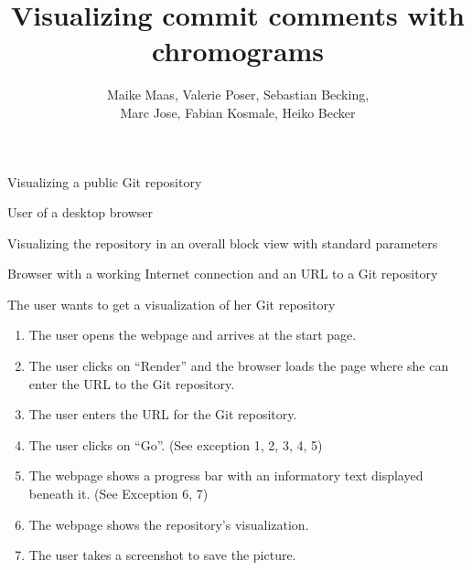 \documentclass[11pt]{scrartcl}
\author{Maike Maas, Valerie Poser, Sebastian Becking,\\
Marc Jose, Fabian Kosmale, Heiko Becker}
\title{Visualizing commit comments with chromograms}
\begin{document}
\maketitle

\begin{description}[leftmargin=!,labelwidth=\widthof{\bfseries Frequency of use:}]
	\item[Use-case:] Visualizing a public Git repository 
	\item[Primary actor:] User of a desktop browser 
	\item[Goal in context:] Visualizing the repository in an overall block view with standard parameters 
	\item[Preconditions:] Browser with a working Internet connection and an URL to a Git repository
	\item[Trigger:] The user wants to get a visualization of her Git repository 

	\item[Scenario:]
		\begin{enumerate}[leftmargin=1.5em]
			\item The user opens the webpage and arrives at the start page.
			\item The user clicks on \enquote{Render} and the browser loads the page where
				she can enter the URL to the Git repository. 
			\item The user enters the URL for the Git repository. 
			\item The user clicks on \enquote{Go}. (See exception 1, 2, 3, 4, 5)
			\item The webpage shows a progress bar with an
				informatory text displayed beneath
				it. (See Exception 6, 7)
			\item The webpage shows the repository's visualization.
			\item The user takes a screenshot to save the picture. 
		\end{enumerate}


\end{description}
\end{document}
